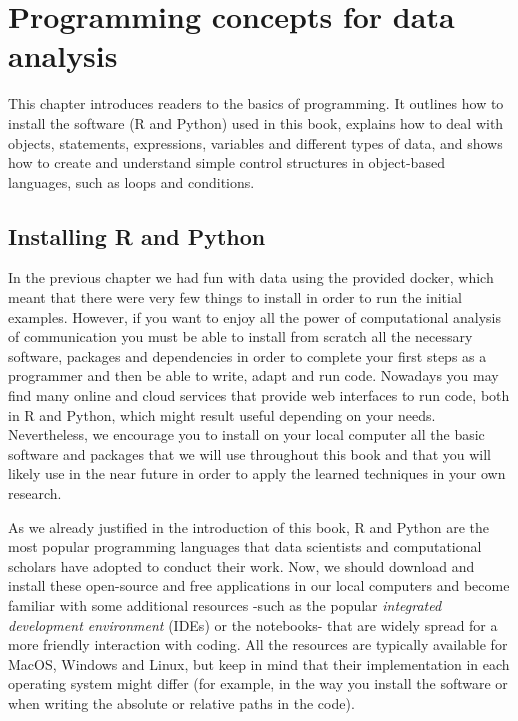 
\chapter{Programming concepts for data analysis}

This chapter introduces readers to the basics of programming. It outlines how to install the software (R and Python) used in this book, explains how to deal with objects, statements, expressions, variables and different types of data, and shows how to create and understand simple control structures in object-based languages, such as loops and conditions.

\section{Installing R and Python}

In the previous chapter we had fun with data using the provided docker, which meant that there were very few things to install in order to run the initial examples. However, if you want to enjoy all the power of computational analysis of communication you must be able to install from scratch all the necessary software, packages and dependencies in order to complete your first steps as a programmer and then be able to write, adapt and run code. Nowadays you may find many online and cloud services that provide web interfaces to run code, both in R and Python, which might result useful depending on your needs. Nevertheless, we encourage you to install on your local computer all the basic software and packages that we will use throughout this book and that you will likely use in the near future in order to apply the learned techniques in your own research.  

As we already justified in the introduction of this book, R and Python are the most popular programming languages that data scientists and computational scholars have adopted to conduct their work.  Now, we should download and install these open-source and free applications in our local computers and become familiar with some additional resources -such as the popular \emph{integrated development environment} (IDEs) or the notebooks- that are widely spread for a more friendly interaction with coding. All the resources are typically available for MacOS, Windows and Linux, but keep in mind that their implementation in each operating system might differ (for example, in the way you install the software or when writing the absolute or relative paths in the code). 

